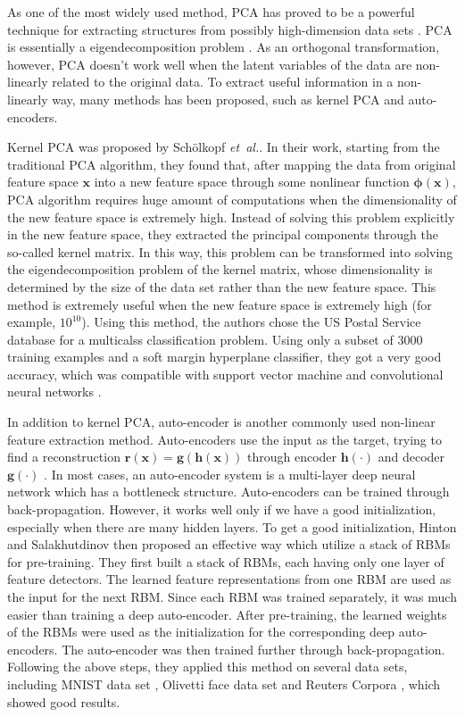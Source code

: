 \documentclass[tikz, multi,dvipsnames,svgnames,x11names]{article}
\begin{document}
As one of the most widely used method, PCA has proved to be a powerful technique for extracting structures from possibly high-dimension data sets \cite{scholkopf1998nonlinear}. PCA is essentially a eigendecomposition problem \cite{friedman2001elements}. As an orthogonal transformation, however, PCA doesn't work well when the latent variables of the data are non-linearly related to the original data. To extract useful information in a non-linearly way, many methods has been proposed, such as kernel PCA and auto-encoders.

Kernel PCA was proposed by Sch\"{o}lkopf {\em et~al.}\cite{scholkopf1998nonlinear}. In their work, starting from the traditional PCA algorithm, they found that, after mapping the data from original feature space $\bm{x}$ into a new feature space through some nonlinear function $\bm{\phi(\bm{x})}$, PCA algorithm requires huge amount of computations when the dimensionality of the new feature space is extremely high. Instead of solving this problem explicitly in the new feature space, they extracted the principal components through the so-called kernel matrix. In this way, this problem can be transformed into solving the eigendecomposition problem of the kernel matrix, whose dimensionality is determined by the size of the data set rather than the new feature space. This method is extremely useful when the new feature space is extremely high (for example, $10^{10}$). Using this method, the authors chose the US Postal Service database for a multicalss classification problem. Using only a subset of $3000$ training examples and a soft margin hyperplane classifier, they got a very good accuracy, which was compatible with support vector machine and convolutional neural networks \cite{scholkopf1998nonlinear}.

In addition to kernel PCA, auto-encoder is another commonly used non-linear feature extraction method. Auto-encoders use the input as the target, trying to find a reconstruction $\bm{r(\bm{x})} = \bm{g(h(\bm{x}))}$ through encoder $\bm h(\cdot)$ and decoder $\bm g(\cdot)$ \cite{bengio2012deep}. In most cases, an auto-encoder system is a multi-layer deep neural network which has a bottleneck structure. Auto-encoders can be trained through back-propagation. However, it works well only if we have a good initialization, especially when there are many hidden layers. To get a good initialization, Hinton and Salakhutdinov \cite{hinton2006reducing} then proposed an effective way which utilize a stack of RBMs for pre-training. They first built a stack of RBMs, each having only one layer of feature detectors. The learned feature representations from one RBM are used as the input for the next RBM. Since each RBM was trained separately, it was much easier than training a deep auto-encoder. After pre-training, the learned weights of the RBMs were used as the initialization for the corresponding deep auto-encoders. The auto-encoder was then trained further through back-propagation. Following the above steps, they applied this method on several data sets, including MNIST data set \cite{lecun1998gradient}, Olivetti face data set \cite{samaria1994parameterisation} and Reuters Corpora \cite{lewis2004rcv1}, which showed good results.
\end{document}
